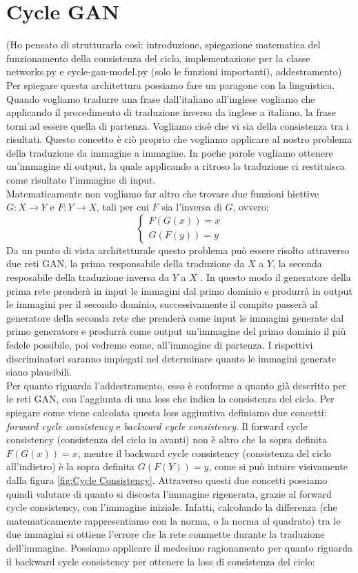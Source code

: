 \section{Cycle GAN}
(Ho pensato di strutturarla così: introduzione, spiegazione matematica del funzionamento della consistenza del ciclo, implementazione per la classe networks.py e cycle-gan-model.py (solo le funzioni importanti), addestramento)\\
Per spiegare questa architettura possiamo fare un paragone con la linguistica. Quando vogliamo tradurre una frase dall'italiano all'inglese vogliamo che applicando il procedimento di traduzione inversa da inglese a italiano, la frase torni ad essere quella di partenza. Vogliamo cioè che vi sia della consistenza tra i risultati. Questo concetto è ciò proprio che vogliamo applicare al nostro problema della traduzione da immagine a immagine. In poche parole vogliamo ottenere un'immagine di output, la quale applicando a ritroso la traduzione ci restituisca come risultato l'immagine di input. 
\\Matematicamente non vogliamo far altro che trovare due funzioni biettive $G:X\rightarrow{}Y$ e $F:Y\rightarrow{}X$, tali per cui $F$ sia l'inversa di $G$, ovvero:
$$\begin{cases}
  F(G(x))=x\\
  G(F(y))=y  
\end{cases}
$$
Da un punto di vista architetturale questo problema può essere risolto attraverso due reti GAN, la prima responsabile della traduzione da $X$ a $Y$, la seconda resposabile della traduzione inversa da $Y$ a $X$ \cite{Zhu_2017_ICCV}. In questo modo il generatore della prima rete prenderà in input le immagini dal primo dominio e produrrà in output le immagini per il secondo dominio, successivamente il compito passerà al generatore della seconda rete che prenderà come input le immagini generate dal primo generatore e produrrà come output un'immagine del primo dominio il più fedele possibile, poi vedremo come, all'immagine di partenza. I rispettivi discriminatori saranno impiegati nel determinare quanto le immagini generate siano plausibili. 
\\Per quanto riguarda l'addestramento, esso è conforme a quanto già descritto per le reti GAN, con l'aggiunta di una loss che indica la consistenza del ciclo. Per spiegare come viene calcolata questa loss aggiuntiva definiamo due concetti: \emph{forward cycle consistency} e \emph{backward cycle consistency}. Il forward cycle consistency (consistenza del ciclo in avanti) non è altro che la sopra definita $F(G(x))=x$, mentre il backward cycle consistency (consistenza del ciclo all'indietro) è la sopra definita $G(F(Y))=y$, come si può intuire visivamente dalla figura \ref{fig:Cycle Consistency}. Attraverso questi due concetti possiamo quindi valutare di quanto si discosta l'immagine rigenerata, grazie al forward cycle consistency, con l'immagine iniziale. Infatti, calcolando la differenza (che matematicamente rappresentiamo con la norma, o la norma al quadrato) tra le due immagini si ottiene l'errore che la rete commette durante la traduzione dell'immagine. Possiamo applicare il medesimo ragionamento per quanto riguarda il backward cycle consistency per ottenere la loss di consistenza del ciclo:
